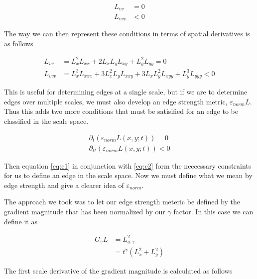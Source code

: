 \documentclass{article}
\begin{document}
\begin{equation} \label{eq:c1}
  \begin{aligned}
    L_{vv} &= 0 \\
    L_{vvv} &< 0
  \end{aligned}
\end{equation}

The way we can then represent these conditions in terms of spatial derivatives is as follows

\begin{equation}
  \begin{aligned}
    L_{vv} &= L_x^2L_{xx}+2L_xL_yL_{xy}+L_y^2L_{yy} = 0 \\
    L_{vvv} &= L_x^3L_{xxx} +3L_x^2L_yL_{xxy}+3L_xL_y^2L_{xyy}+L_y^3L_{yyy} < 0
  \end{aligned}
\end{equation}

This is useful for determining edges at a single scale, but if we are to determine edges over multiple scales, we must also develop an edge strength metric, $\varepsilon_{norm}L$.
Thus this adds two more conditions that must be satisified for an edge to be classified in the scale space. 

\begin{equation} \label{eq:c2}
  \begin{aligned}
    \partial_t(\varepsilon_{norm}L(x,y;t)) = 0\\
    \partial_{tt}(\varepsilon_{norm}L(x,y;t)) < 0
  \end{aligned}
\end{equation}

Then equation \ref{eq:c1} in conjunction with \ref{eq:c2} form the neccessary constraints for us to define an edge in the scale space.
Now we must define what we mean by edge strength and give a clearer idea of $\varepsilon_{norm}$.

The approach we took was to let our edge strength meteric be defined by the gradient magnitude that has been normalized by our $\gamma$ factor.
In this case we can define it as 

\begin{equation}
  \begin{aligned}
    G_{\gamma}L &= L_{g,\gamma}^2 \\
    &= t^{\gamma}(L_x^2+L_y^2)
  \end{aligned}
\end{equation}

The first scale derivative of the gradient magnitude is calculated as follows
\end{document}
